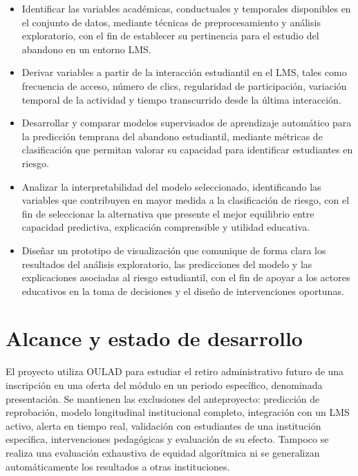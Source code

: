 \begin{itemize}
	\item Identificar las variables académicas, conductuales y temporales disponibles en el conjunto de datos, mediante técnicas de preprocesamiento y análisis exploratorio, con el fin de establecer su pertinencia para el estudio del abandono en un entorno LMS.
	
	
	\item Derivar variables a partir de la interacción estudiantil en el LMS, tales como frecuencia de acceso, número de clics, regularidad de participación, variación temporal de la actividad y tiempo transcurrido desde la última interacción.
	
	
	\item Desarrollar y comparar modelos supervisados de aprendizaje automático para la predicción temprana del abandono estudiantil, mediante métricas de clasificación que permitan valorar su capacidad para identificar estudiantes en riesgo.
	
	
	\item Analizar la interpretabilidad del modelo seleccionado, identificando las variables que contribuyen en mayor medida a la clasificación de riesgo, con el fin de seleccionar la alternativa que presente el mejor equilibrio entre capacidad predictiva, explicación comprensible y utilidad educativa.
	
	
	\item Diseñar un prototipo de visualización que comunique de forma clara los resultados del análisis exploratorio, las predicciones del modelo y las explicaciones asociadas al riesgo estudiantil, con el fin de apoyar a los actores educativos en la toma de decisiones y el diseño de intervenciones oportunas.
\end{itemize}

\section{Alcance y estado de desarrollo}
El proyecto utiliza OULAD para estudiar el retiro administrativo futuro de una inscripción en una oferta del módulo en un periodo específico, denominada presentación. Se mantienen las exclusiones del anteproyecto: predicción de reprobación, modelo longitudinal institucional completo, integración con un LMS activo, alerta en tiempo real, validación con estudiantes de una institución específica, intervenciones pedagógicas y evaluación de su efecto. Tampoco se realiza una evaluación exhaustiva de equidad algorítmica ni se generalizan automáticamente los resultados a otras instituciones.

